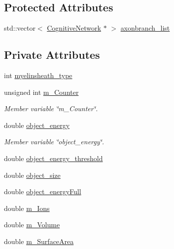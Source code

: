 \subsection*{Protected Attributes}
\begin{DoxyCompactItemize}
\item 
std\+::vector$<$ \mbox{\hyperlink{classCognitiveNetwork}{Cognitive\+Network}} $\ast$ $>$ \mbox{\hyperlink{classMyelinSheath_a7877f5feab5bae37903653bf89dc3d5b}{axonbranch\+\_\+list}}
\end{DoxyCompactItemize}
\subsection*{Private Attributes}
\begin{DoxyCompactItemize}
\item 
int \mbox{\hyperlink{classMyelinSheath_a567eae60904df1812447cc55ecd43e70}{myelinsheath\+\_\+type}}
\item 
unsigned int \mbox{\hyperlink{classMyelinSheath_ab8aab14d9707ee30265faa73c601e7d6}{m\+\_\+\+Counter}}
\begin{DoxyCompactList}\small\item\em Member variable \char`\"{}m\+\_\+\+Counter\char`\"{}. \end{DoxyCompactList}\item 
double \mbox{\hyperlink{classMyelinSheath_ac30cc301a8bcbdf03c66dd0c73a65e13}{object\+\_\+energy}}
\begin{DoxyCompactList}\small\item\em Member variable \char`\"{}object\+\_\+energy\char`\"{}. \end{DoxyCompactList}\item 
double \mbox{\hyperlink{classMyelinSheath_a5099ab3d740d0127f4b6697b51d8f61b}{object\+\_\+energy\+\_\+threshold}}
\item 
double \mbox{\hyperlink{classMyelinSheath_a780de7cd0440fa006b8e6fff6586c6dc}{object\+\_\+size}}
\item 
double \mbox{\hyperlink{classMyelinSheath_a301d5466675d2bc58e367ca2b97c2680}{object\+\_\+energy\+Full}}
\item 
double \mbox{\hyperlink{classMyelinSheath_a05dcc6e1cc6ddd322ea6d70c04294ac1}{m\+\_\+\+Ions}}
\item 
double \mbox{\hyperlink{classMyelinSheath_a2c9fb3682ac15eb0a1c39acfbce6e284}{m\+\_\+\+Volume}}
\item 
double \mbox{\hyperlink{classMyelinSheath_a8e8410a18e4464464ea4bc1629a95e68}{m\+\_\+\+Surface\+Area}}

\end{DoxyCompactItemize}

